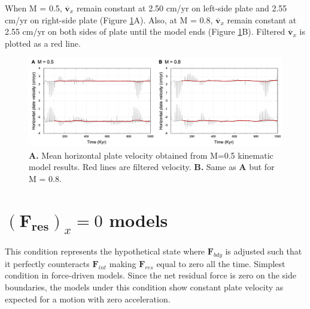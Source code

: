 \documentclass[letterpaper,12pt,notitle]{memphisthesis}                     %
\begin{document}
When M = 0.5, $\overline{\boldsymbol{v}}_{x}$ remain constant at 2.50 cm/yr on left-side plate and 2.55 cm/yr on right-side plate (Figure \ref{fig:kmhv}A). Also, at M = 0.8, $\overline{\boldsymbol{v}}_{x}$ remain constant at 2.55 cm/yr on both sides of plate until the model ends (Figure \ref{fig:kmhv}B). Filtered $\overline{\boldsymbol{v}}_{x}$ is plotted as a red line.
%
\begin{figure}[!htb]
	\centering
	\includegraphics[width=0.98\linewidth]{./figs/kmhv.png}
	\caption{\textbf{A.} Mean horizontal plate velocity obtained from M=0.5 kinematic model results. Red lines are filtered velocity. \textbf{B.} Same as \textbf{A} but for M = 0.8. }
	\label{fig:kmhv}
\end{figure}

\section{$(\boldsymbol{F_{res}})_x=0$ models}

This condition represents the hypothetical state where $\boldsymbol{F}_{bdy}$ is adjusted such that it perfectly counteracts $\boldsymbol{F}_{int}$ making $\boldsymbol{F}_{res}$ equal to zero all the time. Simplest condition in force-driven models. Since the net residual force is zero on the side boundaries, the models under this condition show constant plate velocity as expected for a motion with zero acceleration.
\end{document}
